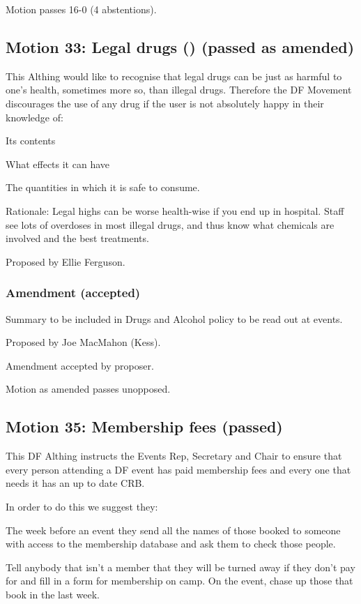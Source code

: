 \documentclass[a4paper, 12pt]{article}
\begin{document}
Motion passes 16-0 (4 abstentions).

\subsection{Motion 33: Legal drugs () (passed as amended)}
This Althing would like to recognise that legal drugs can be just as harmful to one's health, sometimes more so, than illegal drugs. Therefore the DF Movement discourages the use of any drug if the user is not absolutely happy in their knowledge of:
\begin{enumerate*}
	\item Its contents
	\item What effects it can have
	\item The quantities in which it is safe to consume.
\end{enumerate*}

Rationale: Legal highs can be worse health-wise if you end up in hospital. Staff see lots of overdoses in most illegal drugs, and thus know what chemicals are involved and the best treatments.

Proposed by Ellie Ferguson.

\subsubsection{Amendment (accepted)}
Summary to be included in Drugs and Alcohol policy to be read out at events.

Proposed by Joe MacMahon (Kess).

Amendment accepted by proposer.

Motion as amended passes unopposed.

\subsection{Motion 35: Membership fees (passed)}
This DF Althing instructs the Events Rep, Secretary and Chair to ensure that every person attending a DF event has paid membership fees and every one that needs it has an up to date CRB.

In order to do this we suggest they:
\begin{enumerate*}
	\item The week before an event they send all the names of those booked to someone with access to the membership database and ask them to check those people.
	\item Tell anybody that isn't a member that they will be turned away if they don't pay for and fill in a form for membership on camp. On the event, chase up those that book in the last week.
\end{enumerate*}
\end{document}
